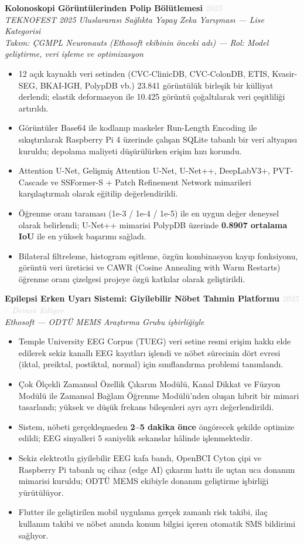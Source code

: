 \documentclass[11pt,a4paper]{article}
\newcommand{\blueitem}[1]{\textcolor{subtitleblue}{\textbf{#1}}}
\newcommand{\daterange}[1]{\hfill \textcolor{lightgray}{\textit{#1}}}
\begin{document}
\blueitem{Kolonoskopi Görüntülerinden Polip Bölütlemesi} \daterange{2025}\\
\textit{TEKNOFEST 2025 Uluslararası Sağlıkta Yapay Zeka Yarışması --- Lise Kategorisi} \\
\textit{Takım: ÇGMPL Neuronauts (Ethosoft ekibinin önceki adı) --- Rol: Model geliştirme, veri işleme ve optimizasyon}
\begin{itemize}
    \item 12 açık kaynaklı veri setinden (CVC-ClinicDB, CVC-ColonDB, ETIS, Kvasir-SEG, BKAI-IGH, PolypDB vb.) 23.841 görüntülük birleşik bir külliyat derlendi; elastik deformasyon ile 10.425 görüntü çoğaltılarak veri çeşitliliği artırıldı.
    \item Görüntüler Base64 ile kodlanıp maskeler Run-Length Encoding ile sıkıştırılarak Raspberry Pi 4 üzerinde çalışan SQLite tabanlı bir veri altyapısı kuruldu; depolama maliyeti düşürülürken erişim hızı korundu.
    \item Attention U-Net, Gelişmiş Attention U-Net, U-Net++, DeepLabV3+, PVT-Cascade ve SSFormer-S + Patch Refinement Network mimarileri karşılaştırmalı olarak eğitilip değerlendirildi.
    \item Öğrenme oranı taraması (1e-3 / 1e-4 / 1e-5) ile en uygun değer deneysel olarak belirlendi; U-Net++ mimarisi PolypDB üzerinde \textbf{0.8907 ortalama IoU} ile en yüksek başarımı sağladı.
    \item Bilateral filtreleme, histogram eşitleme, özgün kombinasyon kayıp fonksiyonu, görüntü veri üreticisi ve CAWR (Cosine Annealing with Warm Restarts) öğrenme oranı çizelgesi projeye özgü katkılar olarak geliştirildi.
\end{itemize}

\blueitem{Epilepsi Erken Uyarı Sistemi: Giyilebilir Nöbet Tahmin Platformu} \daterange{2025 -- Devam Ediyor}\\
\textit{Ethosoft --- ODTÜ MEMS Araştırma Grubu işbirliğiyle}
\begin{itemize}
    \item Temple University EEG Corpus (TUEG) veri setine resmi erişim hakkı elde edilerek sekiz kanallı EEG kayıtları işlendi ve nöbet sürecinin dört evresi (iktal, preiktal, postiktal, normal) için sınıflandırma problemi tanımlandı.
    \item Çok Ölçekli Zamansal Özellik Çıkarım Modülü, Kanal Dikkat ve Füzyon Modülü ile Zamansal Bağlam Öğrenme Modülü'nden oluşan hibrit bir mimari tasarlandı; yüksek ve düşük frekans bileşenleri ayrı ayrı değerlendirildi.
    \item Sistem, nöbeti gerçekleşmeden \textbf{2--5 dakika önce} öngörecek şekilde optimize edildi; EEG sinyalleri 5 saniyelik sekanslar hâlinde işlenmektedir.
    \item Sekiz elektrotlu giyilebilir EEG kafa bandı, OpenBCI Cyton çipi ve Raspberry Pi tabanlı uç cihaz (edge AI) çıkarım hattı ile uçtan uca donanım mimarisi kuruldu; ODTÜ MEMS ekibiyle donanım geliştirme işbirliği yürütülüyor.
    \item Flutter ile geliştirilen mobil uygulama gerçek zamanlı risk takibi, ilaç kullanım takibi ve nöbet anında konum bilgisi içeren otomatik SMS bildirimi sağlıyor.
\end{itemize}
\end{document}
